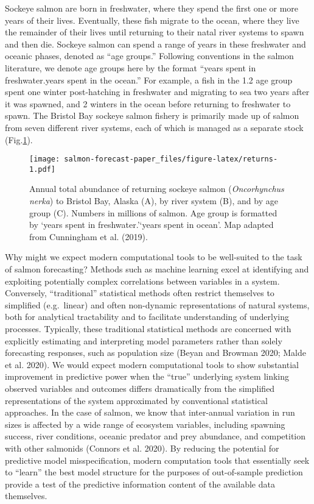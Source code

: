 \documentclass[
]{article}
\begin{document}
Sockeye salmon are born in freshwater, where they spend the first one or more years of their lives. Eventually, these fish migrate to the ocean, where they live the remainder of their lives until returning to their natal river systems to spawn and then die. Sockeye salmon can spend a range of years in these freshwater and oceanic phases, denoted as ``age groups.'' Following conventions in the salmon literature, we denote age groups here by the format ``years spent in freshwater.years spent in the ocean.'' For example, a fish in the 1.2 age group spent one winter post-hatching in freshwater and migrating to sea two years after it was spawned, and 2 winters in the ocean before returning to freshwater to spawn. The Bristol Bay sockeye salmon fishery is primarily made up of salmon from seven different river systems, each of which is managed as a separate stock (Fig.\ref{fig:returns}).

\begin{figure}
\centering
\texttt{[image: salmon-forecast-paper\_files/figure-latex/returns-1.pdf]}
\caption{\label{fig:returns}Annual total abundance of returning sockeye salmon (\emph{Oncorhynchus nerka}) to Bristol Bay, Alaska (A), by river system (B), and by age group (C). Numbers in millions of salmon. Age group is formatted by `years spent in freshwater.'`years spent in ocean'. Map adapted from Cunningham et al. (2019).}
\end{figure}

Why might we expect modern computational tools to be well-suited to the task of salmon forecasting? Methods such as machine learning excel at identifying and exploiting potentially complex correlations between variables in a system. Conversely, ``traditional'' statistical methods often restrict themselves to simplified (e.g.~linear) and often non-dynamic representations of natural systems, both for analytical tractability and to facilitate understanding of underlying processes. Typically, these traditional statistical methods are concerned with explicitly estimating and interpreting model parameters rather than solely forecasting responses, such as population size (Beyan and Browman 2020; Malde et al. 2020). We would expect modern computational tools to show substantial improvement in predictive power when the ``true'' underlying system linking observed variables and outcomes differs dramatically from the simplified representations of the system approximated by conventional statistical approaches. In the case of salmon, we know that inter-annual variation in run sizes is affected by a wide range of ecosystem variables, including spawning success, river conditions, oceanic predator and prey abundance, and competition with other salmonids (Connors et al. 2020). By reducing the potential for predictive model misspecification, modern computation tools that essentially seek to ``learn'' the best model structure for the purposes of out-of-sample prediction provide a test of the predictive information content of the available data themselves.
\end{document}
